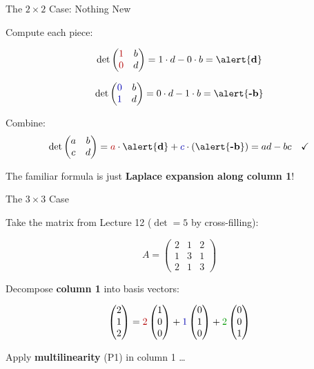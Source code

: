 \documentclass[10pt]{beamer}
\theoremstyle{definition}
\newcommand{\x}[1]{\alert{\textbf{#1}}}
\newcommand{\rd}[1]{{\color{red!70!black}#1}}
\newcommand{\bl}[1]{{\color{blue!70!black}#1}}
\newcommand{\gn}[1]{{\color{green!60!black}#1}}
\begin{document}
\begin{frame}{The $2 \times 2$ Case: Nothing New}

Compute each piece:

$$
\det\begin{pmatrix} \rd{1} & b \\ \rd{0} & d \end{pmatrix}
= 1 \cdot d - 0 \cdot b = \x{d}
$$

$$
\det\begin{pmatrix} \bl{0} & b \\ \bl{1} & d \end{pmatrix}
= 0 \cdot d - 1 \cdot b = \x{-b}
$$

\vfill

Combine:
$$
\det\begin{pmatrix} a & b \\ c & d \end{pmatrix}
= \rd{a} \cdot \x{d} + \bl{c} \cdot (\x{-b})
= ad - bc \quad \checkmark
$$

\vfill

The familiar formula is just \x{Laplace expansion along column 1}!

\end{frame}


\begin{frame}{The $3 \times 3$ Case}

Take the matrix from Lecture 12 \;($\det = 5$ by cross-filling):

$$
A = \begin{pmatrix} 2 & 1 & 2 \\ 1 & 3 & 1 \\ 2 & 1 & 3 \end{pmatrix}
$$

\vfill

Decompose \x{column 1} into basis vectors:

$$
\begin{pmatrix} 2 \\ 1 \\ 2 \end{pmatrix}
= \rd{2}\begin{pmatrix} 1 \\ 0 \\ 0 \end{pmatrix}
+ \bl{1}\begin{pmatrix} 0 \\ 1 \\ 0 \end{pmatrix}
+ \gn{2}\begin{pmatrix} 0 \\ 0 \\ 1 \end{pmatrix}
$$

\vfill

Apply \x{multilinearity} (P1) in column 1 \ldots

\end{frame}
\end{document}
